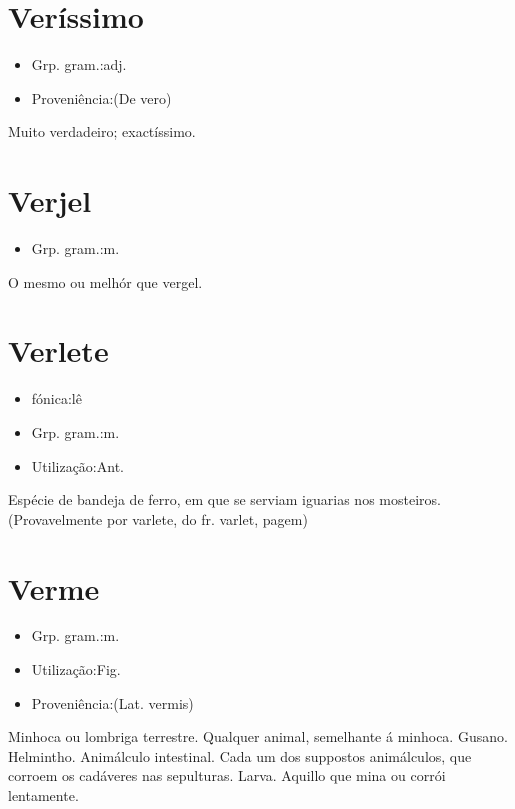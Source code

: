 \documentclass{article}
\begin{document}
\section{Veríssimo}
\begin{itemize}
\item {Grp. gram.:adj.}
\end{itemize}
\begin{itemize}
\item {Proveniência:(De \textunderscore vero\textunderscore )}
\end{itemize}
Muito verdadeiro; exactíssimo.
\section{Verjel}
\begin{itemize}
\item {Grp. gram.:m.}
\end{itemize}
O mesmo ou melhór que \textunderscore vergel\textunderscore .
\section{Verlete}
\begin{itemize}
\item {fónica:lê}
\end{itemize}
\begin{itemize}
\item {Grp. gram.:m.}
\end{itemize}
\begin{itemize}
\item {Utilização:Ant.}
\end{itemize}
Espécie de bandeja de ferro, em que se serviam iguarias nos mosteiros.
(Provavelmente por \textunderscore varlete\textunderscore , do fr. \textunderscore varlet\textunderscore , pagem)
\section{Verme}
\begin{itemize}
\item {Grp. gram.:m.}
\end{itemize}
\begin{itemize}
\item {Utilização:Fig.}
\end{itemize}
\begin{itemize}
\item {Proveniência:(Lat. \textunderscore vermis\textunderscore )}
\end{itemize}
Minhoca ou lombriga terrestre.
Qualquer animal, semelhante á minhoca.
Gusano.
Helmintho.
Animálculo intestinal.
Cada um dos suppostos animálculos, que corroem os cadáveres nas sepulturas.
Larva.
Aquillo que mina ou corrói lentamente.
\end{document}
